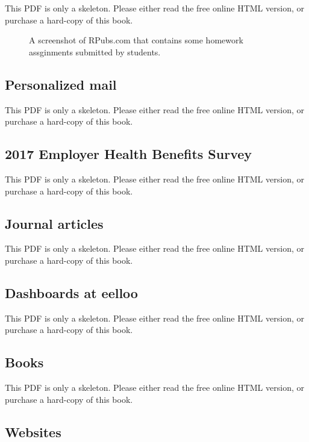 \documentclass[
  11pt,
]{krantz}
\theoremstyle{definition}
\theoremstyle{definition}
\theoremstyle{definition}
\theoremstyle{definition}
\theoremstyle{remark}
\begin{document}
This PDF is only a skeleton. Please either read the free online HTML version, or purchase a hard-copy of this book.

\begin{figure}\caption{A screenshot of RPubs.com that contains some homework assginments submitted by students.}\end{figure}

\subsection{Personalized mail}\label{personalized-mail}

This PDF is only a skeleton. Please either read the free online HTML version, or purchase a hard-copy of this book.

\subsection{2017 Employer Health Benefits Survey}\label{employer-health-benefits-survey}

This PDF is only a skeleton. Please either read the free online HTML version, or purchase a hard-copy of this book.

\subsection{Journal articles}\label{examples-journal}

This PDF is only a skeleton. Please either read the free online HTML version, or purchase a hard-copy of this book.

\subsection{Dashboards at eelloo}\label{dashboards-at-eelloo}

This PDF is only a skeleton. Please either read the free online HTML version, or purchase a hard-copy of this book.

\subsection{Books}\label{examples-books}

This PDF is only a skeleton. Please either read the free online HTML version, or purchase a hard-copy of this book.

\subsection{Websites}\label{examples-websites}
\end{document}
